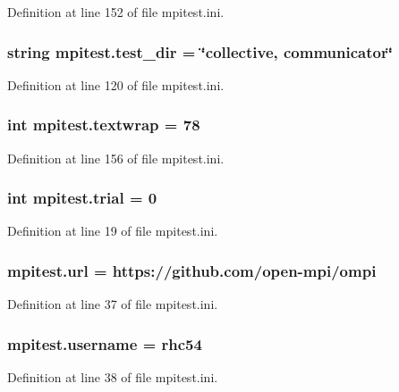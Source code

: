 Definition at line 152 of file mpitest.\-ini.

\hypertarget{namespacempitest_afb14b0cb9c4139a5d3f2bf30599704ab}{
\subsubsection[{test\-\_\-dir}]{\setlength{\rightskip}{0pt plus 5cm}string mpitest.\-test\-\_\-dir = \char`\"{}collective, communicator\char`\"{}}}\label{namespacempitest_afb14b0cb9c4139a5d3f2bf30599704ab}


Definition at line 120 of file mpitest.\-ini.

\hypertarget{namespacempitest_a4ff3a6f6296976b6e0ed6249357c3542}{
\subsubsection[{textwrap}]{\setlength{\rightskip}{0pt plus 5cm}int mpitest.\-textwrap = 78}}\label{namespacempitest_a4ff3a6f6296976b6e0ed6249357c3542}


Definition at line 156 of file mpitest.\-ini.

\hypertarget{namespacempitest_aa0f43e6283b3889679e6631336f043d1}{
\subsubsection[{trial}]{\setlength{\rightskip}{0pt plus 5cm}int mpitest.\-trial = 0}}\label{namespacempitest_aa0f43e6283b3889679e6631336f043d1}


Definition at line 19 of file mpitest.\-ini.

\hypertarget{namespacempitest_aae573db72acd85d3ee46589c81be2d37}{
\subsubsection[{url}]{\setlength{\rightskip}{0pt plus 5cm}mpitest.\-url = https\-://github.\-com/open-\/mpi/ompi}}\label{namespacempitest_aae573db72acd85d3ee46589c81be2d37}


Definition at line 37 of file mpitest.\-ini.

\hypertarget{namespacempitest_a862f2676bbe33c7059e3a136b4b96ddc}{
\subsubsection[{username}]{\setlength{\rightskip}{0pt plus 5cm}mpitest.\-username = rhc54}}\label{namespacempitest_a862f2676bbe33c7059e3a136b4b96ddc}


Definition at line 38 of file mpitest.\-ini.

